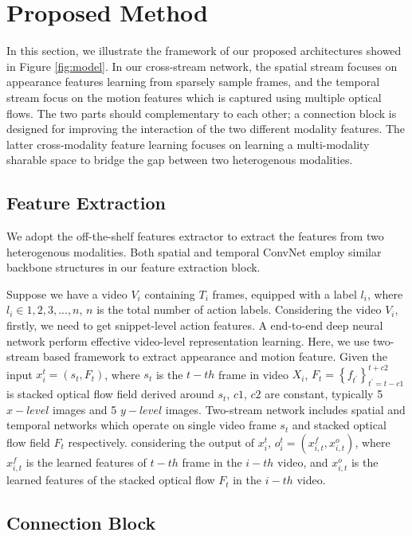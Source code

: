 \documentclass[conference,compsoc]{IEEEtran}
\begin{document}
\section{Proposed Method}
\label{S:3}


In this section, we illustrate the framework of our proposed architectures showed in Figure \ref{fig:model}. In our cross-stream network, the spatial stream focuses on appearance features learning from sparsely sample frames, and the temporal stream focus on the motion features which is captured using multiple optical flows. The two parts should complementary to each other; a connection block is designed for improving the interaction of the two different modality features. The latter cross-modality feature learning focuses on learning a multi-modality sharable space to bridge the gap between two heterogenous modalities.

\subsection{Feature Extraction}

We adopt the off-the-shelf features extractor to extract the features from two heterogenous modalities. Both spatial and temporal ConvNet employ similar backbone structures in our feature extraction block.


Suppose we have a video $V_{i}$ containing $T_{i}$ frames,  equipped with a label $l_{i}$, where $l_{i} \in {1, 2, 3, ..., n}$,  $n$ is the total number of action labels. Considering the video $V_{i}$, firstly, we need to get snippet-level action features. A end-to-end deep neural network perform effective video-level representation learning. Here, we use two-stream based framework \cite{simonyan2014two} to extract appearance and motion feature. Given the input $x_{i}^{t}=(s_{t}, F_{t})$, where $s_{t}$ is the $t-th$ frame in video $X_{i}$, $F_{t}=\left\{f_{t^{\prime}}\right\}_{t^{\prime}=t-c1}^{t+c2}$ is stacked optical flow field derived around $s_{t}$,  $c1$, $c2$ are constant, typically 5 $x-level$ images and 5 $y-level$ images. Two-stream network includes spatial and temporal networks which operate on single video frame $s_{t}$ and stacked optical flow field $F_{t}$ respectively. considering the output of $x_{i}^{t}$, $o_{i}^{t}=(x_{i,t}^{f}, x_{i,t}^{o})$, where $x_{i,t}^{f}$ is the learned features of $t-th$ frame in the $i-th$ video, and $x_{i,t}^{o}$ is the learned features of the stacked optical flow $F_{t}$ in the $i-th$ video.

\subsection{Connection Block}
\end{document}
